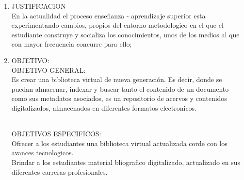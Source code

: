 \begin{enumerate}[1.]
\item JUSTIFICACION 
\\ En la actualidad el proceso enseñanza - aprendizaje superior esta experimentando cambios, propios del entorno metodologico en el que el estudiante construye y socializa los conocimientos, unos de los medios al que con mayor frecuencia concurre para ello; 
	
\item OBJETIVO:
\\ OBJETIVO GENERAL:
\\ Es crear una biblioteca virtual de nueva generación.
Es decir, donde se puedan almacenar, indexar y buscar tanto el contenido de un documento como sus metadatos asociados, es un repositorio de acervos y contenidos digitalizados, almacenados en diferentes formatos electronicos.

\\ OBJETIVOS ESPECIFICOS:
\\ Ofrecer a los estudiantes una biblioteca virtual actualizada corde con los avances tecnologicos.
\\ Brindar a los estudiantes material bliografico digitalizado, actualizado en sus diferentes carreras profesionales.


\end{enumerate} 
